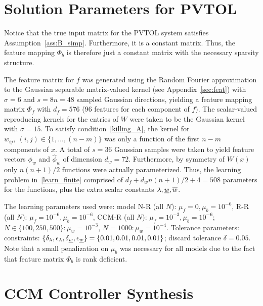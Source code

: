 \section{Solution Parameters for PVTOL}
\label{app:prob_params}

Notice that the true input matrix for the PVTOL system satisfies Assumption~\ref{ass:B_simp}. Furthermore, it is a constant matrix. Thus, the feature mapping $\Phi_b$ is therefore just a constant matrix with the necessary sparsity structure.

The feature matrix for $f$ was generated using the Random Fourier approximation to the Gaussian separable matrix-valued kernel (see Appendix~\ref{sec:feat}) with $\sigma = 6$ and $s = 8n = 48$ sampled Gaussian directions, yielding a feature mapping matrix $\Phi_f$ with $d_f = 576$ (96 features for each component of $f$). The scalar-valued reproducing kernels for the entries of $W$ were taken to be the Gaussian kernel with $\sigma = 15$. To satisfy condition~\eqref{killing_A}, the kernel for $w_{ij}, \ (i,j) \in \{1,\ldots,(n-m)\}$ was only a function of the first $n-m$ components of $x$. A total of $s = 36$ Gaussian samples were taken to yield feature vectors $\phi_w$ and $\hat{\phi}_w$ of dimension $d_w = 72$.  Furthermore, by symmetry of $W(x)$ only $n(n+1)/2$ functions were actually parameterized. Thus, the learning problem in~\eqref{learn_finite} comprised of $d_f + d_w n(n+1)/2 + 4 = 508$ parameters for the functions, plus the extra scalar constants $\lambda,\underline{w},\overline{w}$.

The learning parameters used were: model N-R (all $N$): $\mu_f = 0, \mu_b = 10^{-6}$, R-R (all $N$): $\mu_f = 10^{-6}, \mu_b = 10^{-6}$, CCM-R (all $N$): $\mu_f = 10^{-3}, \mu_b = 10^{-6}$; $N \in \{100,250,500\}: \mu_w = 10^{-3}$, $N = 1000: \mu_w = 10^{-4}$. Tolerance parameters: constraints: $\{\delta_{\lambda},\epsilon_{\lambda},\delta_{\underline{w}}, \epsilon_{\underline{w}}\} = \{0.01,0.01,0.01,0.01\}$; discard tolerance $\delta = 0.05$. Note that a small penalization on $\mu_b$ was necessary for all models due to the fact that feature matrix $\Phi_b$ is rank deficient.

\section{CCM Controller Synthesis} \label{ccm_appendix}

